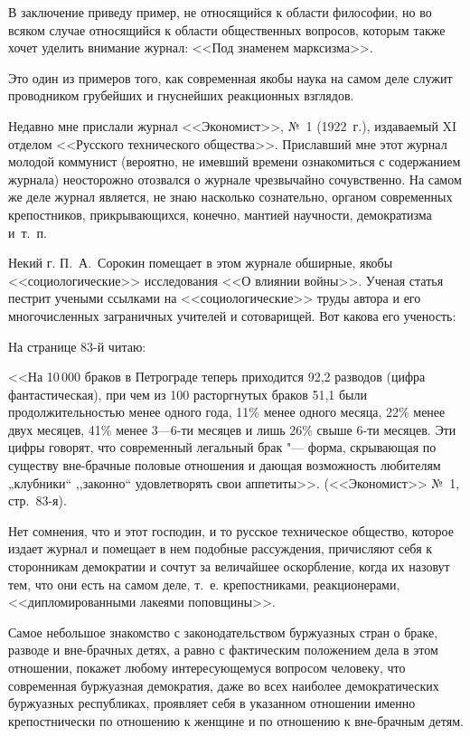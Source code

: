 В заключение приведу пример, не относящийся к области философии, но во
всяком случае относящийся к области общественных вопросов, которым также
хочет уделить внимание журнал: <<Под знаменем марксизма>>.

Это один из примеров того, как современная якобы наука на самом деле служит
проводником грубейших и гнуснейших реакционных взглядов.

Недавно мне прислали журнал <<Экономист>>, №~1 (1922~г.),
издаваемый XI отделом <<Русского технического общества>>. Приславший мне этот
журнал молодой коммунист (вероятно, не имевший времени ознакомиться с
содержанием журнала) неосторожно отозвался о журнале чрезвычайно
сочувственно. На самом же деле журнал является, не знаю насколько
сознательно, органом современных крепостников, прикрывающихся, конечно,
мантией научности, демократизма и~т.~п.

Некий г. П.~А.~Сорокин помещает в этом
журнале обширные, якобы <<социологические>> исследования <<О влиянии войны>>.
Ученая статья пестрит учеными ссылками на <<социологические>> труды автора и
его многочисленных заграничных учителей и сотоварищей. Вот какова его
ученость:

На странице 83-й читаю:

<<На 10\,000 браков в Петрограде теперь приходится 92,2 разводов (цифра
фантастическая), при чем из 100 расторгнутых браков 51,1 были
продолжительностью менее одного года, 11\% менее одного месяца, 22\% менее
двух месяцев, 41\% менее 3---6-ти месяцев и лишь 26\% свыше 6-ти месяцев.
Эти цифры говорят, что современный легальный брак "--- форма, скрывающая по
существу вне-брачные половые отношения и дающая возможность любителям
„клубники“ ,,законно`` удовлетворять свои аппетиты>>. (<<Экономист>>
№~1, стр.~83-я).

Нет сомнения, что и этот господин, и то русское техническое общество,
которое издает журнал и помещает в нем подобные рассуждения, причисляют
себя к сторонникам демократии и сочтут за величайшее оскорбление, когда их
назовут тем, что они есть на самом деле, т.~е. крепостниками,
реакционерами, <<дипломированными лакеями поповщины>>.

Самое небольшое знакомство с законодательством буржуазных стран о браке,
разводе и вне-брачных детях, а равно с фактическим положением дела в этом
отношении, покажет любому интересующемуся вопросом человеку, что
современная буржуазная демократия, даже во всех наиболее демократических
буржуазных республиках, проявляет себя в указанном отношении именно
крепостнически по отношению к женщине и по отношению к вне-брачным детям.

